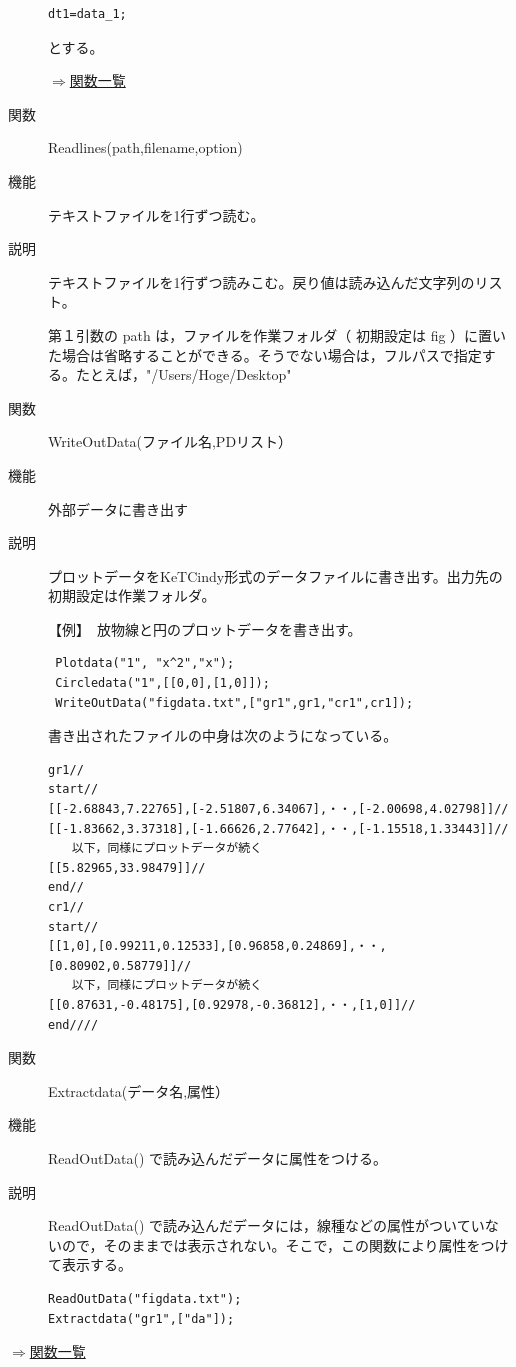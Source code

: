 \documentclass[papersize,a4paper,10pt,uplatex]{jsarticle}
\begin{document}
\begin{description}
\begin{verbatim}
dt1=data_1;
\end{verbatim}

とする。

\begin{flushright}\hyperlink{functionlist}{$\Rightarrow$関数一覧}\end{flushright}

\hypertarget{readlines}{}
\item[関数]Readlines(path,filename,option)
\item[機能]テキストファイルを1行ずつ読む。
\item[説明]テキストファイルを1行ずつ読みこむ。戻り値は読み込んだ文字列のリスト。

第１引数の path は，ファイルを作業フォルダ（ 初期設定は fig ）に置いた場合は省略することができる。そうでない場合は，フルパスで指定する。たとえば，"/Users/Hoge/Desktop"

\vspace{\baselineskip}
\hypertarget{writeoutdata}{}
\item[関数]WriteOutData(ファイル名,PDリスト）
\item[機能]外部データに書き出す
\item[説明]プロットデータをKeTCindy形式のデータファイルに書き出す。出力先の 初期設定は作業フォルダ。

【例】　放物線と円のプロットデータを書き出す。

\begin{verbatim}
 Plotdata("1", "x^2","x");
 Circledata("1",[[0,0],[1,0]]);
 WriteOutData("figdata.txt",["gr1",gr1,"cr1",cr1]);
\end{verbatim}

書き出されたファイルの中身は次のようになっている。

\begin{verbatim}
gr1// 
start//
[[-2.68843,7.22765],[-2.51807,6.34067],・・,[-2.00698,4.02798]]//
[[-1.83662,3.37318],[-1.66626,2.77642],・・,[-1.15518,1.33443]]//
　　以下，同様にプロットデータが続く
[[5.82965,33.98479]]//
end//
cr1//
start//
[[1,0],[0.99211,0.12533],[0.96858,0.24869],・・,[0.80902,0.58779]]//
　　以下，同様にプロットデータが続く
[[0.87631,-0.48175],[0.92978,-0.36812],・・,[1,0]]//
end////
\end{verbatim}

\vspace{\baselineskip}
\hypertarget{extractdata}{}
\item[関数]Extractdata(データ名,属性）
\item[機能]ReadOutData() で読み込んだデータに属性をつける。
\item[説明]ReadOutData() で読み込んだデータには，線種などの属性がついていないので，そのままでは表示されない。そこで，この関数により属性をつけて表示する。
\begin{verbatim}
ReadOutData("figdata.txt");
Extractdata("gr1",["da"]);
\end{verbatim}

\end{description}
\begin{flushright}\hyperlink{functionlist}{$\Rightarrow$関数一覧}\end{flushright}
\end{document}

